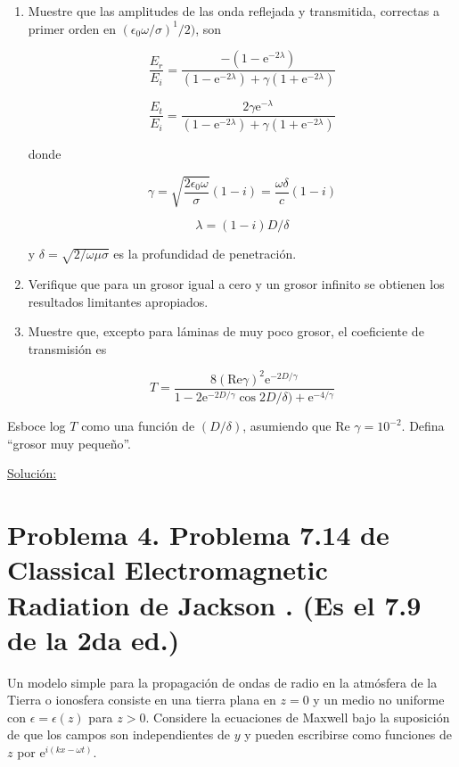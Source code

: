 \documentclass[a4paper,11pt]{article}
\numberwithin{equation}{section}
\newcommand{\euler}{\mathrm{e}}
\begin{document}
\begin{enumerate}[label=\textbf{(\alph*)}]
 \item Muestre que las amplitudes de las onda reflejada y transmitida, correctas 
 a primer orden en $(\epsilon_0 \omega /\sigma)^1/2)$, son 
 
 $$
 \frac{E_r}{E_i} = \frac{-(1 - \euler^{-2\lambda})}{(1 - \euler^{-2\lambda}) 
 + \gamma(1 + \euler^{-2\lambda})}
 $$
 
  $$
 \frac{E_t}{E_i} = \frac{2\gamma \euler^{-\lambda}}{(1 - \euler^{-2\lambda}) 
 + \gamma(1 + \euler^{-2\lambda})}
 $$
 
 donde 
 
 $$
 \gamma = \sqrt{\frac{2\epsilon_0 \omega}{\sigma}}(1 - i) = \frac{\omega \delta}{c}
 (1 - i)
 $$
 
 $$
 \lambda = (1-i)D/\delta
 $$
 
  y $\delta = \sqrt{2/\omega \mu \sigma}$ es la profundidad de penetración.
 
 \item Verifique que para un grosor igual a cero y un grosor infinito se obtienen 
 los resultados limitantes apropiados.
 \item Muestre que, excepto para láminas de muy poco grosor, el coeficiente de 
 transmisión es 
 
 $$
 T = \frac{8(\text{Re} \gamma)^2 \euler^{-2D/\gamma}}{1 - 2\euler^{-2D/\gamma} 
 \cos{2D/\delta) + \euler^{-4/\gamma}}}
 $$
\end{enumerate}

Esboce log $T$ como una función de $(D/\delta)$, asumiendo que Re $\gamma = 10^{-2}$. 
Defina ``grosor muy pequeño''.

\vspace{.3cm}

\underline{Solución:} \vspace{.3cm}

\newpage

\section{Problema 4. Problema 7.14 de Classical Electromagnetic Radiation
de Jackson \cite{jackson}. (Es el 7.9 de la 2da ed.)}

Un modelo simple para la propagación de ondas de radio en la atmósfera de la 
Tierra o ionosfera consiste en una tierra plana en $z = 0$ y un medio no 
uniforme con $\epsilon = \epsilon(z)$ para $z > 0$. Considere la ecuaciones 
de Maxwell bajo la suposición de que los campos son independientes de $y$ y 
pueden escribirse como funciones de $z$ por $\euler^{i(kx - \omega t)}$. 
\end{document}
